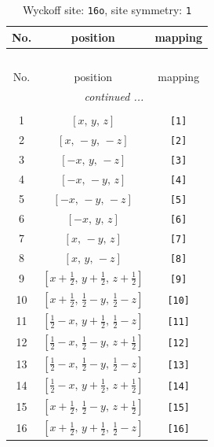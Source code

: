\documentclass[fleqn,8pt]{jsarticle}
\begin{document}
\begin{longtable}{ccc}
\caption{Wyckoff site: {\tt 16o}, site symmetry: {\tt 1}}
 \\
 \hline \hline
No. & position & mapping \\ \hline \endfirsthead

\multicolumn{2}{l}{\tablename\ \thetable{}} \\
 \hline \hline
No. & position & mapping \\ \hline \endhead

 \hline \hline
\multicolumn{2}{r}{\footnotesize\it continued ...} \\ \endfoot

 \hline \hline
\multicolumn{2}{r}{} \\ \endlastfoot

1 & $\left[ x,\, y,\, z \right]$ & {\tt [1]} \\ \hline
2 & $\left[ x,\, - y,\, - z \right]$ & {\tt [2]} \\ \hline
3 & $\left[ - x,\, y,\, - z \right]$ & {\tt [3]} \\ \hline
4 & $\left[ - x,\, - y,\, z \right]$ & {\tt [4]} \\ \hline
5 & $\left[ - x,\, - y,\, - z \right]$ & {\tt [5]} \\ \hline
6 & $\left[ - x,\, y,\, z \right]$ & {\tt [6]} \\ \hline
7 & $\left[ x,\, - y,\, z \right]$ & {\tt [7]} \\ \hline
8 & $\left[ x,\, y,\, - z \right]$ & {\tt [8]} \\ \hline
9 & $\left[ x + \frac{1}{2},\, y + \frac{1}{2},\, z + \frac{1}{2} \right]$ & {\tt [9]} \\ \hline
10 & $\left[ x + \frac{1}{2},\, \frac{1}{2} - y,\, \frac{1}{2} - z \right]$ & {\tt [10]} \\ \hline
11 & $\left[ \frac{1}{2} - x,\, y + \frac{1}{2},\, \frac{1}{2} - z \right]$ & {\tt [11]} \\ \hline
12 & $\left[ \frac{1}{2} - x,\, \frac{1}{2} - y,\, z + \frac{1}{2} \right]$ & {\tt [12]} \\ \hline
13 & $\left[ \frac{1}{2} - x,\, \frac{1}{2} - y,\, \frac{1}{2} - z \right]$ & {\tt [13]} \\ \hline
14 & $\left[ \frac{1}{2} - x,\, y + \frac{1}{2},\, z + \frac{1}{2} \right]$ & {\tt [14]} \\ \hline
15 & $\left[ x + \frac{1}{2},\, \frac{1}{2} - y,\, z + \frac{1}{2} \right]$ & {\tt [15]} \\ \hline
16 & $\left[ x + \frac{1}{2},\, y + \frac{1}{2},\, \frac{1}{2} - z \right]$ & {\tt [16]} \\
\end{longtable}
\end{document}

